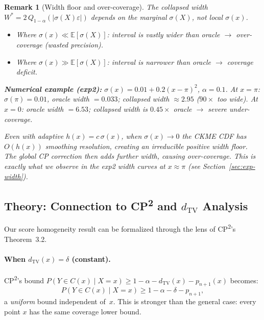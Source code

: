 \documentclass[11pt]{article}
\newtheorem{remark}{Remark}
\begin{document}
\begin{remark}[Width floor and over-coverage]
\label{rem:width-floor}
The collapsed width
$W^* = 2\,Q_{1-\alpha}(|\sigma(X)\varepsilon|)$ depends on the
\emph{marginal} $\sigma(X)$, not local $\sigma(x)$.
\begin{itemize}
  \item Where $\sigma(x) \ll \mathbb{E}[\sigma(X)]$: interval is
    vastly wider than oracle $\to$ over-coverage (wasted precision).
  \item Where $\sigma(x) \gg \mathbb{E}[\sigma(X)]$: interval is
    narrower than oracle $\to$ coverage deficit.
\end{itemize}
\textbf{Numerical example (exp2):}
$\sigma(x) = 0.01 + 0.2(x-\pi)^2$, $\alpha = 0.1$.
At $x = \pi$: $\sigma(\pi) = 0.01$, oracle width $= 0.033$;
collapsed width $\approx 2.95$ ($90\times$ too wide).
At $x = 0$: oracle width $= 6.53$; collapsed width is $0.45\times$
oracle $\to$ severe under-coverage.

Even with adaptive $h(x) = c\,\sigma(x)$, when $\sigma(x) \to 0$
the CKME CDF has $O(h(x))$ smoothing resolution, creating an
irreducible positive width floor. The global CP correction then adds
further width, causing over-coverage. This is exactly what we observe
in the exp2 width curves at $x \approx \pi$
(see Section~\ref{sec:exp-width}).
\end{remark}

\subsection{Theory: Connection to CP\textsuperscript{2} and $d_{\mathrm{TV}}$ Analysis}
\label{sec:dtv-analysis}

Our score homogeneity result can be formalized through the lens of
CP\textsuperscript{2}'s Theorem~3.2.

\paragraph{When $d_{\mathrm{TV}}(x) = \delta$ (constant).}
CP\textsuperscript{2}'s bound $P(Y \in C(x) \mid X = x) \ge 1 - \alpha
- d_{\mathrm{TV}}(x) - p_{n+1}(x)$ becomes:
\[
  P(Y \in C(x) \mid X = x) \ge 1 - \alpha - \delta - p_{n+1},
\]
a \emph{uniform} bound independent of~$x$. This is stronger than the
general case: every point $x$ has the same coverage lower bound.
\end{document}
